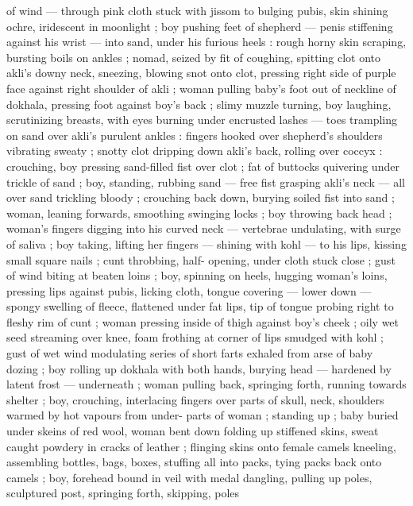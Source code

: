 of wind --- through pink cloth stuck with jissom to bulging pubis, skin 
shining ochre, iridescent in moonlight ; boy pushing feet of shepherd 
--- penis stiffening against his wrist --- into sand, under his furious 
heels : rough horny skin scraping, bursting boils on ankles ; nomad, 
seized by fit of coughing, spitting clot onto akli's downy neck, 
sneezing, blowing snot onto clot, pressing right side of purple face 
against right shoulder of akli ; woman pulling baby's foot out of 
neckline of dokhala, pressing foot against boy's back ; slimy muzzle 
turning, boy laughing, scrutinizing breasts, with eyes burning under 
encrusted lashes --- toes trampling on sand over akli's purulent 
ankles : fingers hooked over shepherd's shoulders vibrating sweaty 
; snotty clot dripping down akli's back, rolling over coccyx : 
crouching, boy pressing sand-filled fist over clot ; fat of buttocks 
quivering under trickle of sand ; boy, standing, rubbing sand --- free 
fist grasping akli's neck --- all over sand trickling bloody ; crouching 
back down, burying soiled fist into sand ; woman, leaning forwards, 
smoothing swinging locks ; boy throwing back head ; woman's 
fingers digging into his curved neck --- vertebrae undulating, with 
surge of saliva ; boy taking, lifting her fingers --- shining with kohl 
--- to his lips, kissing small square nails ; cunt throbbing, half- 
opening, under cloth stuck close ; gust of wind biting at beaten loins 
; boy, spinning on heels, hugging woman's loins, pressing lips 
against pubis, licking cloth, tongue covering --- lower down --- 
spongy swelling of fleece, flattened under fat lips, tip of tongue 
probing right to fleshy rim of cunt ; woman pressing inside of thigh 
against boy's cheek ; oily wet seed streaming over knee, foam 
frothing at corner of lips smudged with kohl ; gust of wet wind 
modulating series of short farts exhaled from arse of baby dozing ; 
boy rolling up dokhala with both hands, burying head --- hardened 
by latent frost --- underneath ; woman pulling back, springing forth, 
running towards shelter ; boy, crouching, interlacing fingers over 
parts of skull, neck, shoulders warmed by hot vapours from under- 
parts of woman ; standing up ; baby buried under skeins of red wool, 
woman bent down folding up stiffened skins, sweat caught powdery 
in cracks of leather ; flinging skins onto female camels kneeling, 
assembling bottles, bags, boxes, stuffing all into packs, tying packs 
back onto camels ; boy, forehead bound in veil with medal dangling, 
pulling up poles, sculptured post, springing forth, skipping, poles 
